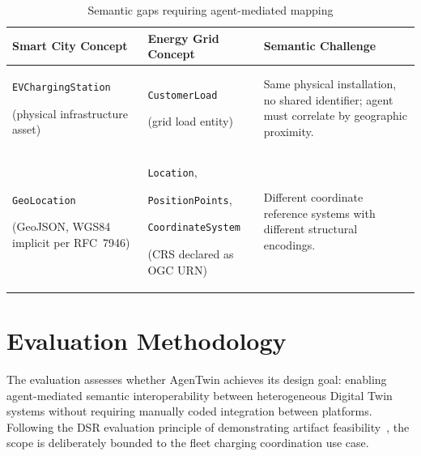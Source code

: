 \begin{table}[H]
    \centering
    \small
    \begin{tabular}{ | m{4cm} | m{4cm} | m{5cm} | }
        \hline

        \textbf{Smart City Concept} & \textbf{Energy Grid Concept} & \textbf{Semantic Challenge} \\
        \hline

            \texttt{EVChargingStation}

            (physical infrastructure asset)
            
            &
            
            \texttt{CustomerLoad}

            (grid load entity)
            
            &
            
            Same physical installation, no shared identifier; agent must correlate by geographic proximity. \\
        \hline
            
            \texttt{GeoLocation}
            
            (GeoJSON,
            WGS84 implicit per RFC~7946)
            
            &
            
            \texttt{Location},
            
            \texttt{PositionPoints},
            
            \texttt{CoordinateSystem}

            (CRS declared as OGC URN)
            
            &

            Different coordinate reference systems with different structural encodings.\\
        \hline

    \end{tabular}
    \caption{Semantic gaps requiring agent-mediated mapping}
    \label{tab:semantic-gaps}
\end{table}

\section{Evaluation Methodology}
\label{sec:evaluation-methodology}

The evaluation assesses whether AgenTwin achieves its design goal:
    enabling agent-mediated semantic interoperability between heterogeneous Digital Twin systems
    without requiring manually coded integration between platforms.
Following the DSR evaluation principle of demonstrating artifact feasibility~\cite{peffers2007},
    the scope is deliberately bounded to the fleet charging coordination use case.

